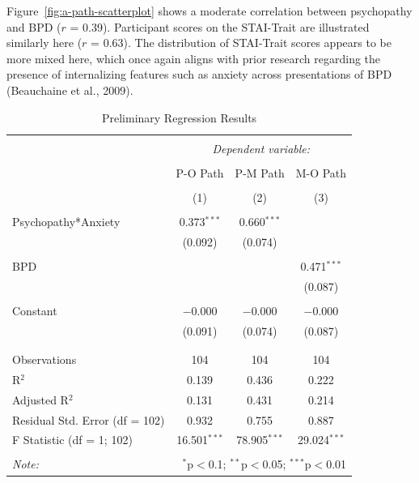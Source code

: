 \documentclass[
  man,floatsintext]{apa7}
\begin{document}
Figure~\ref{fig:a-path-scatterplot} shows a moderate correlation between psychopathy and BPD (\(r\) = 0.39). Participant scores on the STAI-Trait are illustrated similarly here (\(r\) = 0.63). The distribution of STAI-Trait scores appears to be more mixed here, which once again aligns with prior research regarding the presence of internalizing features such as anxiety across presentations of BPD (Beauchaine et al., 2009).

\begin{table}[!htbp] \centering 
  \caption{Preliminary Regression Results} 
  \label{tab:prelim-regression-output} 
\begin{tabular}{@{\extracolsep{1pt}}lccc} 
\\[-1.8ex]\hline 
\hline \\[-1.8ex] 
 & \multicolumn{3}{c}{\textit{Dependent variable:}} \\ 
\cline{2-4} 
\\[-1.8ex] & P-O Path & P-M Path & M-O Path \\ 
\\[-1.8ex] & (1) & (2) & (3)\\ 
\hline \\[-1.8ex] 
 Psychopathy*Anxiety & 0.373$^{***}$ & 0.660$^{***}$ &  \\ 
  & (0.092) & (0.074) &  \\ 
  & & & \\ 
 BPD &  &  & 0.471$^{***}$ \\ 
  &  &  & (0.087) \\ 
  & & & \\ 
 Constant & $-$0.000 & $-$0.000 & $-$0.000 \\ 
  & (0.091) & (0.074) & (0.087) \\ 
  & & & \\ 
\hline \\[-1.8ex] 
Observations & 104 & 104 & 104 \\ 
R$^{2}$ & 0.139 & 0.436 & 0.222 \\ 
Adjusted R$^{2}$ & 0.131 & 0.431 & 0.214 \\ 
Residual Std. Error (df = 102) & 0.932 & 0.755 & 0.887 \\ 
F Statistic (df = 1; 102) & 16.501$^{***}$ & 78.905$^{***}$ & 29.024$^{***}$ \\ 
\hline 
\hline \\[-1.8ex] 
\textit{Note:}  & \multicolumn{3}{r}{$^{*}$p$<$0.1; $^{**}$p$<$0.05; $^{***}$p$<$0.01} \\ 
\end{tabular} 
\end{table}
\end{document}
